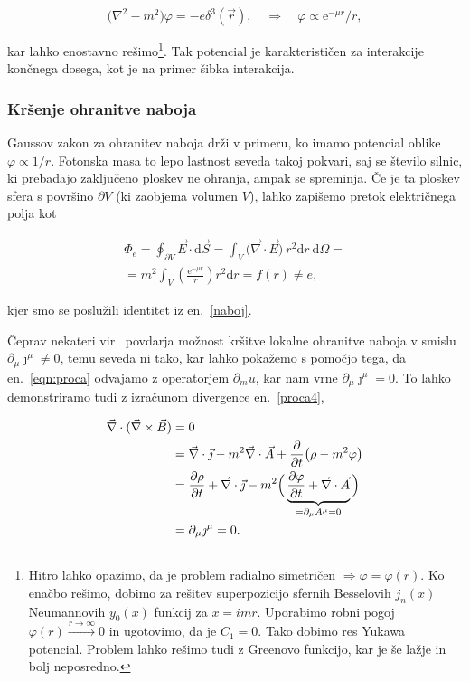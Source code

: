 \documentclass[a4paper, twocolumn, titlepage]{article}
\newcommand{\rot}{
	\ensuremath{\vec{\nabla}\times}
}
\renewcommand{\div}{
	\ensuremath{\vec{\nabla}\cdot}
}
\newcommand{\ve}{
	\ensuremath{\vec{E}}
}
\newcommand{\vb}{
	\ensuremath{\vec{B}}
}
\renewcommand{\d}{
	\ensuremath{\mathrm{d}}
}
\begin{document}
\begin{equation}
	\big(\nabla^2 - m^2\big)\varphi = -e\delta^3(\vec{r}), \quad \Longrightarrow \quad \varphi \propto
	\text{e}^{-\mu r}/r,
	\label{naboj}
\end{equation}

kar lahko enostavno rešimo\footnote{Hitro lahko opazimo, da je problem radialno simetričen $\Rightarrow \varphi =
\varphi(r)$. Ko enačbo rešimo, dobimo za rešitev superpozicijo sfernih Besselovih $j_n(x)$ Neumannovih
$y_0(x)$ funkcij za $x = imr$.
Uporabimo robni pogoj $\varphi(r) \stackrel{r\to\infty}{\longrightarrow}0$ in ugotovimo, da je $C_1 = 0$. Tako dobimo res
Yukawa potencial. Problem lahko rešimo tudi z Greenovo funkcijo, kar je še lažje in bolj neposredno.}.
Tak potencial je karakteristi\v cen za interakcije kon\v cnega dosega, kot je na primer \v sibka interakcija.

\subsubsection{Kr\v senje ohranitve naboja}

Gaussov zakon za ohranitev naboja dr\v zi v primeru, ko imamo potencial oblike $\varphi \propto 1/r$. Fotonska masa to
lepo lastnost seveda takoj pokvari, saj se \v stevilo silnic, ki prebadajo zaklju\v ceno ploskev ne ohranja, ampak se
spreminja. \v Ce je ta ploskev sfera s površino $\partial V$ (ki zaobjema volumen $V$), lahko zapi\v semo pretok
elektri\v cnega polja kot

\begin{multline}
	\Phi_e = \oint_{\partial V} \ve \cdot \d \vec{S} = \int_V \big(\div \ve\big)\ r^2\d r\ \d\Omega =\\=
		 m^2 \int_V \left(\frac{\text{e}^{-\mu r}}{r}\right)r^2 \d r = f(r) \neq e,
	\label{pretok}
\end{multline}

kjer smo se poslužili identitet iz en.~\eqref{naboj}.

\v Ceprav nekateri vir~\cite{nieto2} povdarja možnost kršitve lokalne ohranitve naboja v smislu $\partial_\mu\jmath^\mu 
\neq 0$, temu seveda ni tako, kar lahko pokažemo s pomočjo tega, da en.~\eqref{eqn:proca} odvajamo z operatorjem
$\partial_mu$,
kar nam vrne $\partial_\mu\jmath^\mu = 0$. To lahko demonstriramo tudi z izračunom divergence en.~\eqref{proca4},

\begin{align}
	\div(\rot\vb) &= 0 \notag \\
	&= \div\vec{\jmath} - m^2\div\vec{A} + \frac{\partial}{\partial t}\big(\rho - m^2\varphi\big) \notag \\
	&= \frac{\partial\rho}{\partial t} + \div\vec{\jmath} -m^2\Big(\underbrace{\frac{\partial\varphi}{\partial t} +
		\div\vec{A}}_{= \partial_\mu A^\mu = 0}\Big) \notag \\
	&= \partial_\mu\jmath^\mu = 0.
\end{align}
\end{document}
